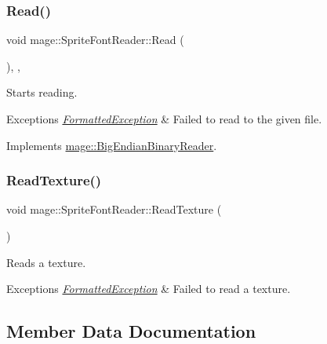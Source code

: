 \subsubsection{\texorpdfstring{Read()}{Read()}}
{\footnotesize\ttfamily void mage\+::\+Sprite\+Font\+Reader\+::\+Read (\begin{DoxyParamCaption}{ }\end{DoxyParamCaption})\hspace{0.3cm}{\ttfamily [override]}, {\ttfamily [private]}, {\ttfamily [virtual]}}

Starts reading.


\begin{DoxyExceptions}{Exceptions}
{\em \hyperlink{structmage_1_1_formatted_exception}{Formatted\+Exception}} & Failed to read to the given file. \\
\hline
\end{DoxyExceptions}


Implements \hyperlink{classmage_1_1_big_endian_binary_reader_af072965dea0319d6366b21cc6562bbf9}{mage\+::\+Big\+Endian\+Binary\+Reader}.

\hypertarget{classmage_1_1_sprite_font_reader_a12877a168b5dc2a95ec307a37d20ddca}{}\label{classmage_1_1_sprite_font_reader_a12877a168b5dc2a95ec307a37d20ddca} 
\subsubsection{\texorpdfstring{Read\+Texture()}{ReadTexture()}}
{\footnotesize\ttfamily void mage\+::\+Sprite\+Font\+Reader\+::\+Read\+Texture (\begin{DoxyParamCaption}{ }\end{DoxyParamCaption})\hspace{0.3cm}{\ttfamily [private]}}

Reads a texture.


\begin{DoxyExceptions}{Exceptions}
{\em \hyperlink{structmage_1_1_formatted_exception}{Formatted\+Exception}} & Failed to read a texture. \\
\hline
\end{DoxyExceptions}


\subsection{Member Data Documentation}
\hypertarget{classmage_1_1_sprite_font_reader_a577e1a05126b5b8d7bbdaa3e83bf32bf}{}\label{classmage_1_1_sprite_font_reader_a577e1a05126b5b8d7bbdaa3e83bf32bf} 
